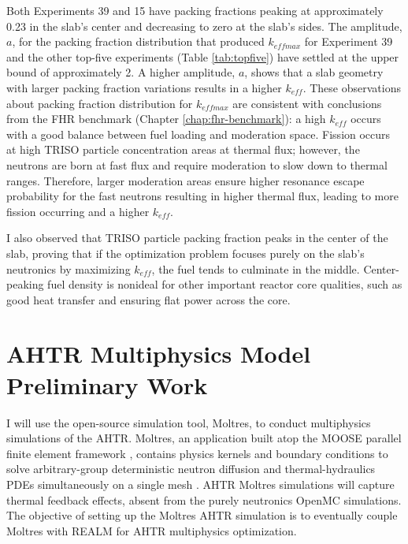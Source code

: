Both Experiments 39 and 15 have packing fractions peaking at approximately 
0.23 in the slab's center and decreasing to zero at the slab's sides.  
The amplitude, $a$, for the packing fraction distribution that produced $k_{eff max}$ 
for Experiment 39 and the other top-five experiments (Table \ref{tab:topfive}) 
have settled at the upper bound of approximately 2. 
A higher amplitude, $a$, shows that a slab geometry with larger packing fraction 
variations results in a higher $k_{eff}$. 
These observations about packing fraction distribution for $k_{eff max}$ are 
consistent with conclusions from the \gls{FHR} benchmark (Chapter 
\ref{chap:fhr-benchmark}): a high $k_{eff}$ occurs with a good balance between 
fuel loading and moderation space. 
Fission occurs at high \gls{TRISO} particle concentration areas at thermal flux;
however, the neutrons are born at fast flux and require moderation to slow down 
to thermal ranges.
Therefore, larger moderation areas ensure higher resonance escape probability for 
the fast neutrons resulting in higher thermal flux, leading to more 
fission occurring and a higher $k_{eff}$. 

I also observed that \gls{TRISO} particle packing fraction peaks in the center 
of the slab, proving that if the optimization problem focuses purely on the 
slab's neutronics by maximizing $k_{eff}$, the fuel tends to culminate in the 
middle. 
Center-peaking fuel density is nonideal for other important reactor core 
qualities, such as good heat transfer and ensuring flat power across the core. 

\section{AHTR Multiphysics Model Preliminary Work}
\label{sec:multiphysics_homo}
I will use the open-source simulation tool, Moltres, to conduct multiphysics 
simulations of the \gls{AHTR}. 
Moltres, an application built atop the \gls{MOOSE} parallel finite element 
framework \cite{gaston_moose:_2009}, contains physics kernels and boundary 
conditions to solve arbitrary-group deterministic neutron diffusion and 
thermal-hydraulics \glspl{PDE} simultaneously on a single mesh
\cite{lindsay_introduction_2018,park_advancement_2020}. 
\gls{AHTR} Moltres simulations will capture thermal feedback effects, absent
from the purely neutronics OpenMC simulations.  
The objective of setting up the Moltres \gls{AHTR} simulation is to eventually 
couple Moltres with \gls{REALM} for \gls{AHTR} multiphysics optimization. 

